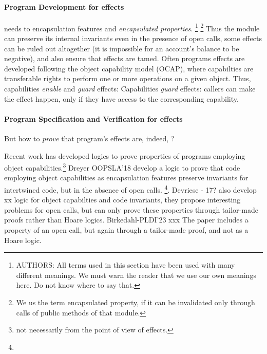 \paragraph{Program Development for \tamed effects} %
needs to
 encapsulation features and \emph{encapsulated properties}.
\footnote{AUTHORS: All terms used in this section have been used with many different meanings. 
We must warn the reader that we use our own meanings here. 
Do not know where to say that.}
\footnote{We us the term encapsulated  property, if it can  be invalidated only through calls of  public methods of that module.}
Thus the module can preserve its internal invariants  even in the presence of open calls,
some effects can be ruled out altogether (\eg it is impossible for an account's balance to be negative), and
also ensure that effects are tamed.
 Often  programs \taming effects are developed following the object capability model (OCAP)\cite{Miller}, where  
 capabilties are transferable rights to perform one or more operations on a given object.
Thus, capabilities \emph{enable} and  \emph{guard} effects:   
Capabilities \emph{guard} effects: callers can make the effect   happen, only if they have access to the corresponding capability.
 
 
\paragraph{Program Specification and Verification  for \tamed effects} But how to \emph{prove} that program's effects are, indeed, \tamed?
 
Recent work has developed logics to prove properties of programs employing object capabilities.\footnote{not necessarily from the point of view of \tamed effects.}
Dreyer OOPSLA'18 develop a logic to prove that   code employing object capabilities as encapsulation features preserve invariants for intertwined code, but in the absence of open calls. 
 \footnote{}.
Devriese - 17? also develop xx logic for object capabilties and code invariants, they propose interesting problems for open calls, 
but can only prove these properties through tailor-made proofs rather than Hoare logics.
Birkedahl-PLDI'23 xxx The paper includes a property of an open call, but again through a tailor-made proof, and not as a Hoare logic.


